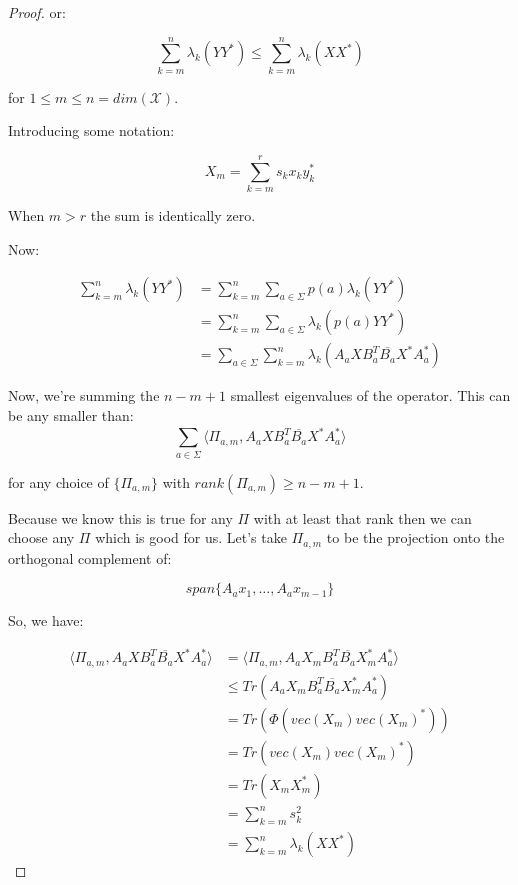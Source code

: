 \documentclass{article}
\begin{document}
\begin{proof}
    or:

    \[ 
        \sum_{k=m}^n \lambda_k(YY^*) \le \sum_{k=m}^n \lambda_k \left( XX^* \right) 
    \]
    
    for $1 \le m \le n = dim(\mathcal{X})$.

    Introducing some notation:

    \[ 
        X_m = \sum_{k=m}^r s_k x_k y_k^* 
    \]
    
    When $m>r$ the sum is identically zero.

    Now:

    \begin{align*}
        \sum_{k=m}^n \lambda_k(YY^*) &= \sum_{k=m}^n \sum_{a\in\Sigma} p(a)
        \lambda_k \left( YY^* \right) \\
        &= \sum_{k=m}^n \sum^{}_{a\in\Sigma} \lambda_k \left( p(a) YY^* \right)
        \\
        &= \sum^{}_{a\in\Sigma} \sum^{n}_{k=m}  \lambda_k \left( A_a X B_a^T
    \overline{B_a} X^* A_a^* \right)
    \end{align*}

    Now, we're summing the $n-m+1$ smallest eigenvalues of the operator. This
    can be any smaller than:
    \[ 
        \sum^{}_{a\in\Sigma} \langle \Pi_{a,m}, A_a X B_a^T \overline{B_a} X^* A_a^* \rangle 
    \]

    for any choice of $\{\Pi_{a,m}\}$ with $rank \left( \Pi_{a,m} \right) \ge
    n-m+1$.

    Because we know this is true for any $\Pi$ with at least that rank then we
    can choose any $\Pi$ which is good for us. Let's take $\Pi_{a,m}$ to be the
    projection onto the orthogonal complement of:
    
    \[ 
        span\{A_a x_1, \ldots, A_a x_{m-1} \} 
    \]
    
    So, we have:

    \begin{align*}
        \langle \Pi_{a,m}, A_a X B_a^T \overline{B_a} X^* A_a^* \rangle &=
        \langle \Pi_{a,m}, A_a X_m B_a^T \overline{B_a} X_m^* A_a^* \rangle \\
        &\le Tr \left( A_a X_m B_a^T \overline{B_a} X_m^* A_a^* \right) \\
        &= Tr \left( \Phi \left( vec(X_m) vec(X_m)^* \right) \right) \\
        &= Tr \left( vec(X_m) vec(X_m)^* \right) \\
        &= Tr \left( X_m X_m^* \right) \\
        &= \sum_{k=m}^n s_k^2 \\
        &= \sum^{n}_{k=m} \lambda_k \left( X X^* \right)
    \end{align*}
\end{proof}
    
\end{document}
